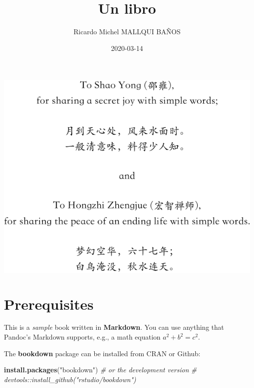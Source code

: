 \documentclass[]{krantz}
\title{Un libro}
\author{Ricardo Michel MALLQUI BAÑOS}
\date{2020-03-14}
\newenvironment{Shaded}{\begin{snugshade}}{\end{snugshade}}
\newcommand{\CommentTok}[1]{\textcolor[rgb]{0.37,0.37,0.37}{\textit{#1}}}
\newcommand{\KeywordTok}[1]{\textcolor[rgb]{0.27,0.27,0.27}{\textbf{#1}}}
\newcommand{\NormalTok}[1]{#1}
\newcommand{\StringTok}[1]{\textcolor[rgb]{0.5,0.5,0.5}{#1}}
\begin{document}
\maketitle

\thispagestyle{empty}
\begin{center}
\includegraphics{dedication.pdf}
\end{center}

\setlength{\abovedisplayskip}{-5pt}
\setlength{\abovedisplayshortskip}{-5pt}

{
\setcounter{tocdepth}{1}
\tableofcontents
}
\hypertarget{prerequisites}{%
\chapter*{Prerequisites}\label{prerequisites}}

This is a \emph{sample} book written in \textbf{Markdown}. You can use anything that Pandoc's Markdown supports, e.g., a math equation \(a^2 + b^2 = c^2\).

The \textbf{bookdown} package can be installed from CRAN or Github:

\begin{Shaded}
\begin{Highlighting}[]
\KeywordTok{install.packages}\NormalTok{(}\StringTok{"bookdown"}\NormalTok{)}
\CommentTok{# or the development version}
\CommentTok{# devtools::install_github("rstudio/bookdown")}
\end{Highlighting}
\end{Shaded}
\end{document}
